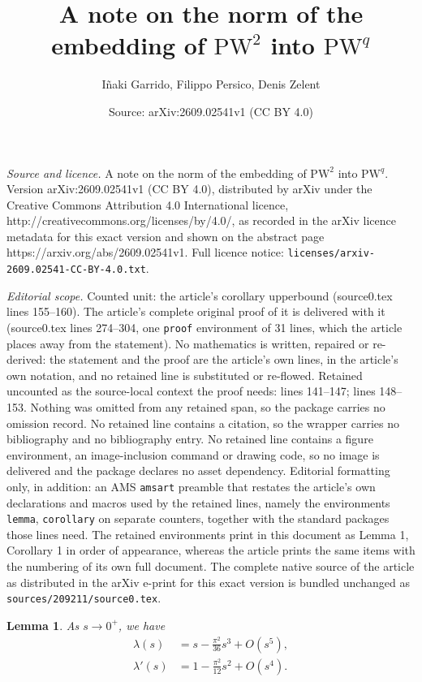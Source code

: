 \documentclass[10pt,a4paper]{amsart}
\title{A note on the norm of the embedding of $\text{PW}^2$ into $\text{PW}^q$}
\author{I\~naki Garrido, Filippo Persico, Denis Zelent}
\date{Source: arXiv:2609.02541v1 (CC BY 4.0)}
\newtheorem{lemma}{Lemma}
\begin{document}
\maketitle

\noindent\emph{Source and licence.} A note on the norm of the embedding of $\text{PW}^2$ into $\text{PW}^q$. Version arXiv:2609.02541v1 (CC BY 4.0), distributed by arXiv under the Creative Commons Attribution 4.0 International licence, http://creativecommons.org/licenses/by/4.0/, as recorded in the arXiv licence metadata for this exact version and shown on the abstract page https://arxiv.org/abs/2609.02541v1. Full licence notice: \texttt{licenses/arxiv-2609.02541-CC-BY-4.0.txt}.\par\smallskip

\noindent\textit{Editorial scope.} Counted unit: the article's corollary upperbound (source0.tex lines 155--160). The article's complete original proof of it is delivered with it (source0.tex lines 274--304, one \texttt{proof} environment of 31 lines, which the article places away from the statement). No mathematics is written, repaired or re-derived: the statement and the proof are the article's own lines, in the article's own notation, and no retained line is substituted or re-flowed.  Retained uncounted as the source-local context the proof needs: lines 141--147; lines 148--153.  Nothing was omitted from any retained span, so the package carries no omission record.  No retained line contains a citation, so the wrapper carries no bibliography and no bibliography entry.  No retained line contains a figure environment, an image-inclusion command or drawing code, so no image is delivered and the package declares no asset dependency.  Editorial formatting only, in addition: an AMS \texttt{amsart} preamble that restates the article's own declarations and macros used by the retained lines, namely the environments \texttt{lemma}, \texttt{corollary} on separate counters, together with the standard packages those lines need.  The retained environments print in this document as Lemma 1, Corollary 1 in order of appearance, whereas the article prints the same items with the numbering of its own full document.  The complete native source of the article as distributed in the arXiv e-print for this exact version is bundled unchanged as \texttt{sources/209211/source0.tex}.
\begin{lemma}\label{smalls}
As $s\to 0^{+}$, we have
\begin{align*}
    \lambda(s) &= s - \frac{\pi^2}{36}s^3 + O(s^5),\\
    \lambda'(s) &= 1 - \frac{\pi^2}{12}s^2 + O(s^4).
\end{align*}
\end{lemma}
\end{document}
